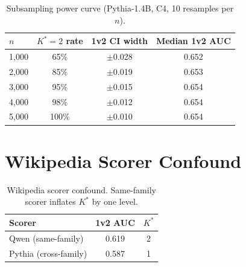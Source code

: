\documentclass[11pt]{article}
\begin{document}
\begin{table}[h]
\centering
\caption{Subsampling power curve (Pythia-1.4B, C4, 10 resamples per $n$).}
\label{tab:power}
\small
\begin{tabular}{lccc}
\toprule
$n$ & $K^*{=}2$ rate & 1v2 CI width & Median 1v2 AUC \\
\midrule
1,000 & 65\% & $\pm$0.028 & 0.652 \\
2,000 & 85\% & $\pm$0.019 & 0.653 \\
3,000 & 95\% & $\pm$0.015 & 0.654 \\
4,000 & 98\% & $\pm$0.012 & 0.654 \\
5,000 & 100\% & $\pm$0.010 & 0.654 \\
\bottomrule
\end{tabular}
\end{table}

\section{Wikipedia Scorer Confound}

\begin{table}[h]
\centering
\caption{Wikipedia scorer confound. Same-family scorer inflates $K^*$ by one level.}
\label{tab:wiki_confound}
\small
\begin{tabular}{lcc}
\toprule
Scorer & 1v2 AUC & $K^*$ \\
\midrule
Qwen (same-family) & 0.619 & 2 \\
Pythia (cross-family) & 0.587 & 1 \\
\bottomrule
\end{tabular}
\end{table}
\end{document}
